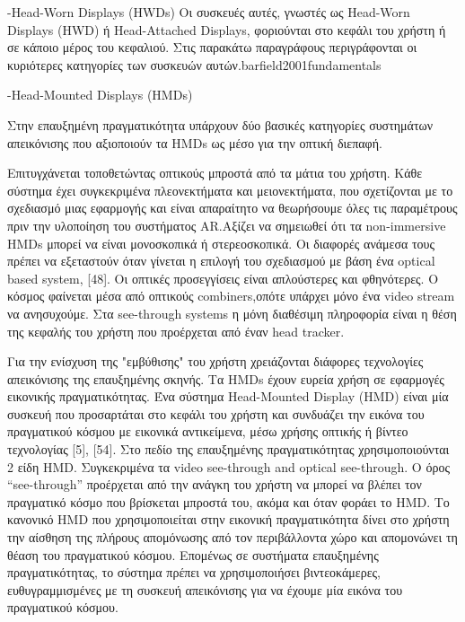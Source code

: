 -Head-Worn Displays (HWDs)
Οι συσκευές αυτές, γνωστές ως Head-Worn Displays (HWD) ή Head-Attached Displays, φοριούνται στο κεφάλι του χρήστη ή σε κάποιο μέρος του κεφαλιού. Στις παρακάτω παραγράφους περιγράφονται οι κυριότερες κατηγορίες των συσκευών αυτών.barfield2001fundamentals

-Head-Mounted Displays (HMDs)

Στην επαυξημένη πραγματικότητα υπάρχουν δύο βασικές κατηγορίες συστημάτων απεικόνισης που αξιοποιούν τα HMDs ως μέσο για την οπτική διεπαφή. 

Επιτυγχάνεται τοποθετώντας οπτικούς μπροστά από τα μάτια του χρήστη. Κάθε σύστημα έχει συγκεκριμένα πλεονεκτήματα και μειονεκτήματα, που σχετίζονται με το σχεδιασμό μιας εφαρμογής και είναι απαραίτητο  να θεωρήσουμε όλες τις παραμέτρους πριν την υλοποίηση του συστήματος AR.Αξίζει να σημειωθεί ότι τα non-immersive HMDs μπορεί να είναι μονοσκοπικά ή στερεοσκοπικά. Οι διαφορές ανάμεσα τους πρέπει να εξεταστούν όταν γίνεται η επιλογή του σχεδιασμού με βάση ένα optical based system, [48]. Οι οπτικές προσεγγίσεις είναι απλούστερες και φθηνότερες. Ο κόσμος φαίνεται μέσα από οπτικούς combiners,οπότε υπάρχει μόνο ένα video stream να ανησυχούμε. Στα see-through systems η μόνη διαθέσιμη πληροφορία είναι η θέση της κεφαλής του χρήστη που προέρχεται από έναν head tracker. 


Για την ενίσχυση της "εμβύθισης" του χρήστη χρειάζονται διάφορες τεχνολογίες απεικόνισης της επαυξημένης σκηνής. Τα HMDs έχουν ευρεία χρήση σε εφαρμογές εικονικής πραγματικότητας. Ένα σύστημα Head-Mounted Display (HMD) είναι μία συσκευή που προσαρτάται στο κεφάλι του χρήστη και συνδυάζει την εικόνα του πραγματικού κόσμου με εικονικά αντικείμενα, μέσω χρήσης οπτικής ή βίντεο τεχνολογίας [5], [54]. Στο πεδίο της επαυξημένης πραγματικότητας χρησιμοποιούνται 2 είδη HMD. Συγκεκριμένα τα video see-through and optical see-through. Ο όρος “see-through” προέρχεται από την ανάγκη του χρήστη να μπορεί να βλέπει τον πραγματικό κόσμο που βρίσκεται μπροστά του, ακόμα και όταν φοράει το HMD. Το κανονικό HMD που χρησιμοποιείται στην εικονική πραγματικότητα δίνει στο χρήστη την αίσθηση της πλήρους απομόνωσης από τον περιβάλλοντα χώρο και απομονώνει τη θέαση του πραγματικού κόσμου. Επομένως σε συστήματα επαυξημένης πραγματικότητας, το σύστημα πρέπει να χρησιμοποιήσει βιντεοκάμερες, ευθυγραμμισμένες με τη συσκευή απεικόνισης για να έχουμε μία εικόνα του πραγματικού κόσμου. 

 



